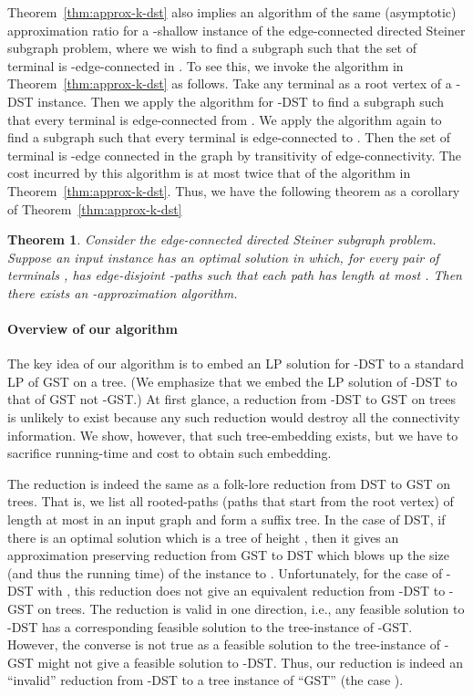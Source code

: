 \documentclass[11pt]{article}
\newtheorem{theorem}{Theorem}
\theoremstyle{definition}
\theoremstyle{remark}
\begin{document}
Theorem~\ref{thm:approx-k-dst} also implies an algorithm of the same 
(asymptotic) approximation ratio for a -shallow instance of 
the  edge-connected directed Steiner subgraph problem, where we
wish to find a subgraph  such that the set of terminal  is
-edge-connected in . 
To see this, we invoke the algorithm in
Theorem~\ref{thm:approx-k-dst} as follows.
Take any terminal  as a root vertex of a -DST instance.
Then we apply the algorithm for -DST to find a subgraph 
such that every terminal is  edge-connected from .
We apply the algorithm again to find a subgraph  
such that every terminal is  edge-connected to .
Then the set of terminal  is -edge connected in the graph
 by transitivity of edge-connectivity.
The cost incurred by this algorithm is at most twice that of 
the algorithm in Theorem~\ref{thm:approx-k-dst}.
Thus, we have the following theorem as a corollary of 
Theorem~\ref{thm:approx-k-dst}

\begin{theorem}
\label{thm:approx-k-conn-subgraph}
\label{thm:approx-k-dst}
Consider the  edge-connected directed Steiner subgraph problem.
Suppose an input instance has an optimal solution  in which,
for every pair of terminals , 
 has  edge-disjoint -paths 
such that each path has length at most . 
Then there exists an -approximation
algorithm.
\end{theorem}

\paragraph{Overview of our algorithm}

The key idea of our algorithm is to embed an LP solution 
for -DST to a standard LP of GST on a tree.
(We emphasize that we embed the LP solution of -DST to that of GST
not -GST.) 
At first glance, a reduction from -DST to GST on trees
is unlikely to exist because any such reduction 
would destroy all the connectivity information.
We show, however, that such tree-embedding exists,
but we have to sacrifice running-time and cost to obtain such
embedding.

The reduction is indeed the same as a folk-lore reduction from DST
to GST on trees. 
That is, we list all rooted-paths (paths that start from the root
vertex) of length at most  in an input graph and form a suffix
tree. 
In the case of DST, if there is an optimal solution which is a tree of
height , then it gives an approximation preserving reduction from
GST to DST which blows up the size (and thus the running time) of the 
instance to .  
Unfortunately, for the case of -DST with , 
this reduction does not give an equivalent reduction 
from -DST to -GST on trees. 
The reduction is valid in one direction, i.e., any feasible solution
to -DST has a corresponding feasible solution to the tree-instance
of -GST. 
However, the converse is not true as a feasible solution to the
tree-instance of -GST might not give a feasible solution to -DST.
Thus, our reduction is indeed an ``invalid'' reduction from -DST to
a tree instance of ``GST'' (the case ).
\end{document}
